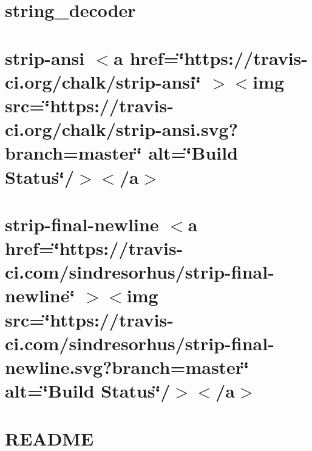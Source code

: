 \documentclass[twoside]{book}
\newcommand{\+}{\discretionary{\mbox{\scriptsize$\hookleftarrow$}}{}{}}
\begin{document}
\chapter{string\+\_\+decoder}
\label{md__c___users_vaishnavi_jadhav__desktop__developer_code_mean_stack_example_client_node_modules_string_decoder__r_e_a_d_m_e}

\chapter{strip-\/ansi \texorpdfstring{$<$}{<}a href=\char`\"{}https\+://travis-\/ci.\+org/chalk/strip-\/ansi\char`\"{} \texorpdfstring{$>$}{>}\texorpdfstring{$<$}{<}img src=\char`\"{}https\+://travis-\/ci.\+org/chalk/strip-\/ansi.\+svg?branch=master\char`\"{} alt=\char`\"{}\+Build Status\char`\"{}/\texorpdfstring{$>$}{>}\texorpdfstring{$<$}{<}/a\texorpdfstring{$>$}{>}}
\label{md__c___users_vaishnavi_jadhav__desktop__developer_code_mean_stack_example_client_node_modules_strip_ansi_readme}

\chapter{strip-\/final-\/newline \texorpdfstring{$<$}{<}a href=\char`\"{}https\+://travis-\/ci.\+com/sindresorhus/strip-\/final-\/newline\char`\"{} \texorpdfstring{$>$}{>}\texorpdfstring{$<$}{<}img src=\char`\"{}https\+://travis-\/ci.\+com/sindresorhus/strip-\/final-\/newline.\+svg?branch=master\char`\"{} alt=\char`\"{}\+Build Status\char`\"{}/\texorpdfstring{$>$}{>}\texorpdfstring{$<$}{<}/a\texorpdfstring{$>$}{>}}
\label{md__c___users_vaishnavi_jadhav__desktop__developer_code_mean_stack_example_client_node_modules_strip_final_newline_readme}

\chapter{README}
\label{md__c___users_vaishnavi_jadhav__desktop__developer_code_mean_stack_example_client_node_modules_stylus_loader__r_e_a_d_m_e}

\end{document}
